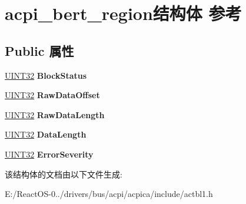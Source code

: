 \hypertarget{structacpi__bert__region}{}\section{acpi\+\_\+bert\+\_\+region结构体 参考}
\label{structacpi__bert__region}
\subsection*{Public 属性}
\begin{DoxyCompactItemize}
\item 
\mbox{\label{structacpi__bert__region_a4d5ba8b648f54d48e2d314ac6173326c}} 
\hyperlink{_processor_bind_8h_ae1e6edbbc26d6fbc71a90190d0266018}{U\+I\+N\+T32} {\bfseries Block\+Status}
\item 
\mbox{\label{structacpi__bert__region_adc0590f300df334710f34bd001f0a08d}} 
\hyperlink{_processor_bind_8h_ae1e6edbbc26d6fbc71a90190d0266018}{U\+I\+N\+T32} {\bfseries Raw\+Data\+Offset}
\item 
\mbox{\label{structacpi__bert__region_a9cf25842cd7c2884dfbc9f8d5611cb5c}} 
\hyperlink{_processor_bind_8h_ae1e6edbbc26d6fbc71a90190d0266018}{U\+I\+N\+T32} {\bfseries Raw\+Data\+Length}
\item 
\mbox{\label{structacpi__bert__region_a2a34209b0d5ac668b945181baab511d6}} 
\hyperlink{_processor_bind_8h_ae1e6edbbc26d6fbc71a90190d0266018}{U\+I\+N\+T32} {\bfseries Data\+Length}
\item 
\mbox{\label{structacpi__bert__region_ae8af4f09b1263fbe63d090b1ce2d1f9f}} 
\hyperlink{_processor_bind_8h_ae1e6edbbc26d6fbc71a90190d0266018}{U\+I\+N\+T32} {\bfseries Error\+Severity}
\end{DoxyCompactItemize}


该结构体的文档由以下文件生成\+:\begin{DoxyCompactItemize}
\item 
E\+:/\+React\+O\+S-\/0../drivers/bus/acpi/acpica/include/actbl1.\+h\end{DoxyCompactItemize}
